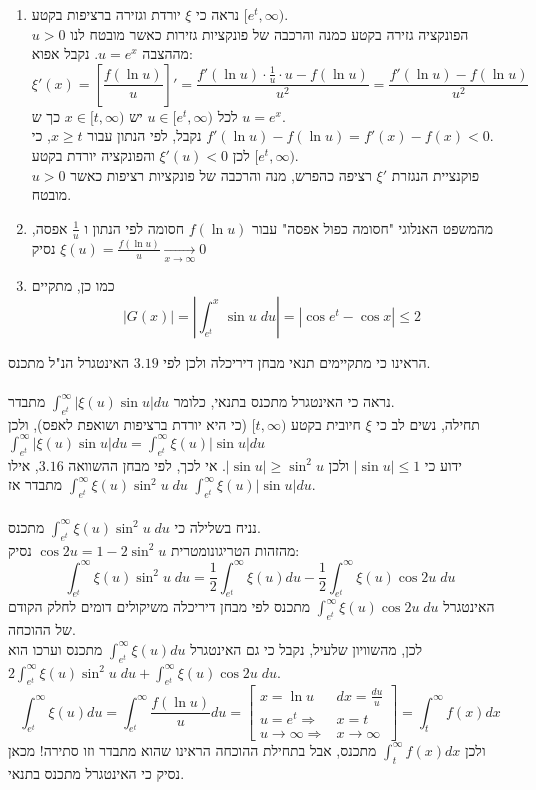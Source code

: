 \documentclass{article}
\begin{document}
\begin{enumerate}[I]
    \item נראה כי $\xi$ יורדת וגזירה ברציפות בקטע $[e^t, \infty)$. \\
          הפונקציה גזירה בקטע כמנה והרכבה של פונקציות גזירות כאשר מובטח לנו $u>0$ מההצבה $u=e^x$. נקבל אפוא:
          \[
              \xi'(x) = [\frac{f(\ln u)}{u}]' =
              \frac{f'(\ln u)\cdot \frac{1}{u} \cdot u - f(\ln u)}{u^2} =
              \frac{f'(\ln u) - f(\ln u)}{u^2}
          \]
          לכל $u\in[e^t, \infty)$ יש $x\in [t,\infty)$ כך ש $u=e^x$. \\
          נקבל, לפי הנתון עבור $x\geq t$, כי $f'(\ln u)-f(\ln u)=f'(x)-f(x)<0$. \\
          לכן $\xi'(u)<0$ והפונקציה יורדת בקטע $[e^t, \infty)$. \\
          פוקנציית הנגזרת $\xi'$ רציפה כהפרש, מנה והרכבה של פונקציות רציפות כאשר $u>0$ מובטח.
    \item מהמשפט האנלוגי "חסומה כפול אפסה" עבור $f(\ln u)$ חסומה לפי הנתון ו $\frac{1}{u}$ אפסה,
          נסיק $\xi(u)=\frac{f(\ln u)}{u}\xrightarrow[x\rightarrow \infty]{}0$
    \item כמו כן, מתקיים
          \[
              |G(x)| = |\int_{e^t}^x \sin u \; du| = |\cos e^t - \cos x| \leq 2
          \]
\end{enumerate}
הראינו כי מתקיימים תנאי מבחן דיריכלה ולכן לפי $3.19$ האינטגרל הנ"ל מתכנס.
\\\\
נראה כי האינטגרל מתכנס בתנאי, כלומר $\int_{e^t}^\infty |\xi(u)\sin u| du$ מתבדר. \\
תחילה, נשים לב כי $\xi$ חיובית בקטע $[t,\infty)$
(כי היא יורדת ברציפות ושואפת לאפס), ולכן $\int_{e^t}^\infty |\xi(u)\sin u| du = \int_{e^t}^\infty \xi(u)|\sin u| du$ \\
ידוע כי $|\sin u|\leq 1$ ולכן $|\sin u| \geq \sin^2u$.
אי לכך, לפי מבחן ההשוואה $3.16$, אילו $\int_{e^t}^\infty \xi(u)\sin^2 u \; du$ מתבדר
אז $\int_{e^t}^\infty \xi(u)|\sin u| du$.
\\\\
נניח בשלילה כי $\int_{e^t}^\infty \xi(u)\sin^2 u \; du$ מתכנס. \\
מהזהות הטריגונומטרית $\cos 2u = 1 - 2\sin^2u$ נסיק:
\[
    \int_{e^t}^\infty \xi(u)\sin^2 u \; du =
    \frac{1}{2}\int_{e^t}^\infty \xi(u) du - \frac{1}{2} \int_{e^t}^\infty \xi(u)\cos 2u \; du
\]
האינטגרל $\int_{e^t}^\infty \xi(u)\cos 2u \; du$ מתכנס לפי מבחן דיריכלה משיקולים דומים לחלק הקודם של ההוכחה.\\
לכן, מהשוויון שלעיל, נקבל כי גם האינטגרל $\int_{e^t}^\infty \xi(u) du$ מתכנס
וערכו הוא $2\int_{e^t}^\infty \xi(u)\sin^2 u \; du + \int_{e^t}^\infty \xi(u)\cos 2u \; du$.
\[
    \int_{e^t}^\infty \xi(u)du =
    \int_{e^t}^\infty \frac{f(\ln u)}{u} du =
    \begin{bmatrix}
        x = \ln u                       & dx = \frac{du}{u}    \\
        u = e^t \Rightarrow             & x = t                \\
        u\rightarrow \infty \Rightarrow & x \rightarrow \infty
    \end{bmatrix} =
    \int_t^\infty f(x)dx
\]
ולכן $\int_t^\infty f(x)dx$ מתכנס,
אבל בתחילת ההוכחה הראינו שהוא מתבדר וזו סתירה! מכאן נסיק כי האינטגרל מתכנס בתנאי.
\end{document}
